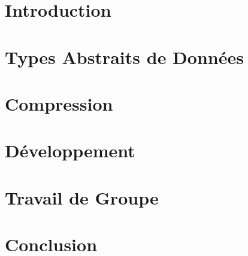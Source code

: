 \documentclass[10pt]{report}
\begin{document}
	\tableofcontents

	\chapter{Introduction} 
        
    
    \chapter{Types Abstraits de Données}
        

    \chapter{Compression}
        
    
    
    

    \chapter{Développement}
    

    \chapter{Travail de Groupe}
        

    \chapter{Conclusion}
        
\end{document}
